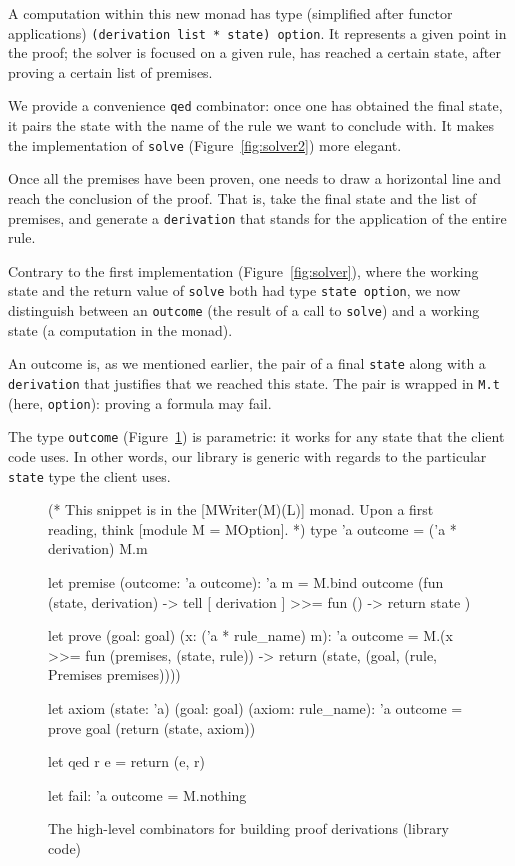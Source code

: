 \documentclass{easychair}
\def\li{\lstinline}
\newcommand{\fref}[1]{Figure~\ref{fig:#1}}
\begin{document}
A computation within this new monad has type (simplified after functor applications)
\li+(derivation list * state) option+. It represents a given point in the proof;
the solver is focused on a given rule, has reached a certain state, after
proving a certain list of premises.

We provide a convenience \li+qed+ combinator: once one has obtained the final
state, it pairs the state with the name of the rule we want to conclude with. It
makes the implementation of \li+solve+ (\fref{solver2}) more elegant.

Once all the premises have been proven, one needs to draw a horizontal line and
reach the conclusion of the proof. That is, take the final state and the list of
premises, and generate a \li+derivation+ that stands for the application of the
entire rule.

Contrary to the first implementation (\fref{solver}), where the working state
and the return value of \li+solve+ both had type \li+state option+, we now
distinguish between an \li+outcome+ (the result of a call to \li+solve+) and a
working state (a computation in the monad).

An outcome is, as we mentioned earlier, the pair of a final \li+state+ along
with a \li+derivation+ that justifies that we reached this state. The pair is
wrapped in \li+M.t+ (here, \li+option+): proving a formula may fail.

The type \li+outcome+ (\fref{combinators}) is parametric: it works for any
state that the client code uses. In other words, our library is generic with
regards to the particular \li+state+ type the client uses.

\begin{figure}
  \centering
\begin{ocaml}
(* This snippet is in the [MWriter(M)(L)] monad. Upon a first reading, think
   [module M = MOption]. *)
type 'a outcome = ('a * derivation) M.m

let premise (outcome: 'a outcome): 'a m =
  M.bind outcome (fun (state, derivation) ->
    tell [ derivation ] >>= fun () ->
    return state
  )

let prove (goal: goal) (x: ('a * rule_name) m): 'a outcome =
  M.(x >>= fun (premises, (state, rule)) ->
    return (state, (goal, (rule, Premises premises))))

let axiom (state: 'a) (goal: goal) (axiom: rule_name): 'a outcome =
  prove goal (return (state, axiom))

let qed r e =
  return (e, r)

let fail: 'a outcome =
  M.nothing
\end{ocaml}
  \caption{The high-level combinators for building proof derivations (library
  code)}
  \label{fig:combinators}
\end{figure}
\end{document}
